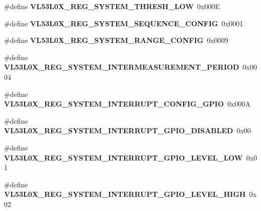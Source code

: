\begin{DoxyCompactItemize}
\#define {\bfseries V\+L53\+L0\+X\+\_\+\+R\+E\+G\+\_\+\+S\+Y\+S\+T\+E\+M\+\_\+\+T\+H\+R\+E\+S\+H\+\_\+\+L\+OW}~0x000E
\item 
\mbox{\label{group__VL53L0X__DefineRegisters__group_gadd8d9d1aa7ca05d809fa0c1dadf3643a}} 
\#define {\bfseries V\+L53\+L0\+X\+\_\+\+R\+E\+G\+\_\+\+S\+Y\+S\+T\+E\+M\+\_\+\+S\+E\+Q\+U\+E\+N\+C\+E\+\_\+\+C\+O\+N\+F\+IG}~0x0001
\item 
\mbox{\label{group__VL53L0X__DefineRegisters__group_ga205cd5e08da045ed2c4a5dac6f20bebe}} 
\#define {\bfseries V\+L53\+L0\+X\+\_\+\+R\+E\+G\+\_\+\+S\+Y\+S\+T\+E\+M\+\_\+\+R\+A\+N\+G\+E\+\_\+\+C\+O\+N\+F\+IG}~0x0009
\item 
\mbox{\label{group__VL53L0X__DefineRegisters__group_gac8a684ca2897371bf74e453600a3ecd1}} 
\#define {\bfseries V\+L53\+L0\+X\+\_\+\+R\+E\+G\+\_\+\+S\+Y\+S\+T\+E\+M\+\_\+\+I\+N\+T\+E\+R\+M\+E\+A\+S\+U\+R\+E\+M\+E\+N\+T\+\_\+\+P\+E\+R\+I\+OD}~0x0004
\item 
\mbox{\label{group__VL53L0X__DefineRegisters__group_gae7162490d657797de685d2bf2dc59918}} 
\#define {\bfseries V\+L53\+L0\+X\+\_\+\+R\+E\+G\+\_\+\+S\+Y\+S\+T\+E\+M\+\_\+\+I\+N\+T\+E\+R\+R\+U\+P\+T\+\_\+\+C\+O\+N\+F\+I\+G\+\_\+\+G\+P\+IO}~0x000A
\item 
\mbox{\label{group__VL53L0X__DefineRegisters__group_ga8341867e76337cc63a8d9489df30832a}} 
\#define {\bfseries V\+L53\+L0\+X\+\_\+\+R\+E\+G\+\_\+\+S\+Y\+S\+T\+E\+M\+\_\+\+I\+N\+T\+E\+R\+R\+U\+P\+T\+\_\+\+G\+P\+I\+O\+\_\+\+D\+I\+S\+A\+B\+L\+ED}~0x00
\item 
\mbox{\label{group__VL53L0X__DefineRegisters__group_gad003aff8dc5b8ca75a373151bd0b3029}} 
\#define {\bfseries V\+L53\+L0\+X\+\_\+\+R\+E\+G\+\_\+\+S\+Y\+S\+T\+E\+M\+\_\+\+I\+N\+T\+E\+R\+R\+U\+P\+T\+\_\+\+G\+P\+I\+O\+\_\+\+L\+E\+V\+E\+L\+\_\+\+L\+OW}~0x01
\item 
\mbox{\label{group__VL53L0X__DefineRegisters__group_ga104dec5ebba6c67ac81009a768a4b789}} 
\#define {\bfseries V\+L53\+L0\+X\+\_\+\+R\+E\+G\+\_\+\+S\+Y\+S\+T\+E\+M\+\_\+\+I\+N\+T\+E\+R\+R\+U\+P\+T\+\_\+\+G\+P\+I\+O\+\_\+\+L\+E\+V\+E\+L\+\_\+\+H\+I\+GH}~0x02

\end{DoxyCompactItemize}
